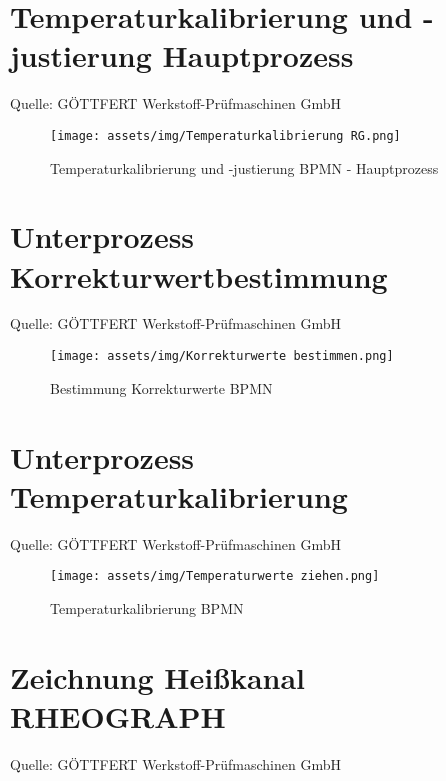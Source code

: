 \section{Temperaturkalibrierung und -justierung Hauptprozess}
Quelle: GÖTTFERT Werkstoff-Prüfmaschinen GmbH
\begin{figure}[ht]
    \begin{center}
        \texttt{[image: assets/img/Temperaturkalibrierung RG.png]}
        \caption{Temperaturkalibrierung und -justierung BPMN - Hauptprozess}
        \label{Temperaturkalibrierung_RG_Haupt}
    \end{center}
\end{figure}
\clearpage

\section{Unterprozess Korrekturwertbestimmung}
Quelle: GÖTTFERT Werkstoff-Prüfmaschinen GmbH
\begin{figure}[ht]
    \begin{center}
        \texttt{[image: assets/img/Korrekturwerte bestimmen.png]}
        \caption{Bestimmung Korrekturwerte BPMN}
        \label{Temperaturkalibrierung_RG_Sub_Korr}
    \end{center}
\end{figure}
\clearpage

\section{Unterprozess Temperaturkalibrierung}
Quelle: GÖTTFERT Werkstoff-Prüfmaschinen GmbH
\begin{figure}[ht]
    \begin{center}
        \texttt{[image: assets/img/Temperaturwerte ziehen.png]}
        \caption{Temperaturkalibrierung BPMN}
        \label{Temperaturkalibrierung_RG_Sub_Temp}
    \end{center}
\end{figure}
\clearpage

\section{Zeichnung Heißkanal RHEOGRAPH}\label{drawing_chamber_channel}
Quelle: GÖTTFERT Werkstoff-Prüfmaschinen GmbH


